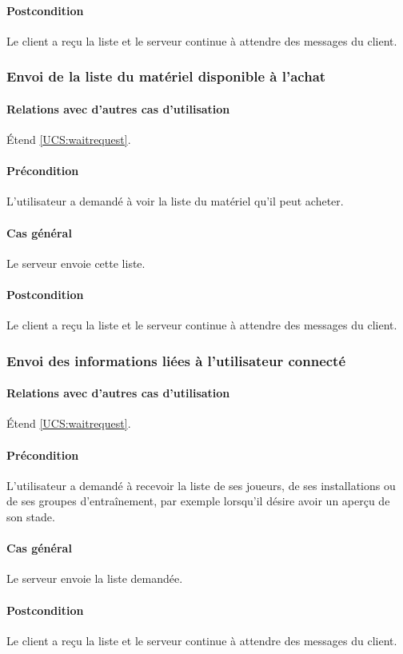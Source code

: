     \paragraph{Postcondition} Le \gls{client} a reçu la liste et le serveur continue à attendre des messages du client.
    
\subsubsection{Envoi de la liste du matériel disponible à l'achat}
	\label{UCS:sendgear}
	\paragraph{Relations avec d'autres cas d'utilisation} \'Etend \ref{UCS:waitrequest}.
	\paragraph{Précondition} L'utilisateur a demandé à voir la liste du matériel qu'il peut acheter.
    \paragraph{Cas général} Le \gls{serveur} envoie cette liste.
    \paragraph{Postcondition} Le \gls{client} a reçu la liste et le serveur continue à attendre des messages du client.
    
\subsubsection{Envoi des informations liées à l'utilisateur connecté}
	\label{UCS:sendinfo}
	\paragraph{Relations avec d'autres cas d'utilisation} \'Etend \ref{UCS:waitrequest}.
	\paragraph{Précondition} L'utilisateur a demandé à recevoir la liste de ses joueurs, de ses installations ou de ses groupes d'entraînement, par exemple lorsqu'il désire avoir un aperçu de son stade.
    \paragraph{Cas général} Le \gls{serveur} envoie la liste demandée.
    \paragraph{Postcondition} Le \gls{client} a reçu la liste et le serveur continue à attendre des messages du client.
    